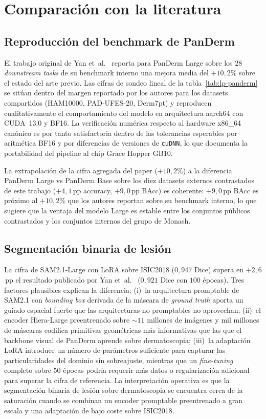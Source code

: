 \section{Comparación con la literatura}
\label{sec:lit}

\subsection{Reproducción del benchmark de PanDerm}
\label{sec:lit-panderm}

El trabajo original de Yan et~al.~\cite{panderm2025} reporta para
PanDerm Large sobre los $28$ \emph{downstream tasks} de su
benchmark interno una mejora media del $+10{,}2\%$ sobre el
estado del arte previo. Las cifras de sondeo lineal de la
tabla~\ref{tab:lp-panderm} se sitúan dentro del margen reportado
por los autores para los datasets compartidos (HAM10000,
PAD-UFES-20, Derm7pt) y reproducen cualitativamente el
comportamiento del modelo en arquitectura aarch64 con CUDA~13.0 y
BF16. La verificación numérica respecto al hardware x86\_64
canónico es por tanto satisfactoria dentro de las tolerancias
esperables por aritmética BF16 y por diferencias de versiones de
\texttt{cuDNN}, lo que documenta la portabilidad del pipeline al
chip Grace Hopper GB10.

La extrapolación de la cifra agregada del paper ($+10{,}2\%$)
a la diferencia PanDerm Large vs PanDerm Base sobre los diez
datasets externos contrastados de este trabajo
($+4{,}1$\,pp accuracy, $+9{,}0$\,pp BAcc) es coherente:
$+9{,}0$\,pp BAcc es próximo al $+10{,}2\%$ que los autores
reportan sobre su benchmark interno, lo que sugiere que la ventaja
del modelo Large es estable entre los conjuntos públicos
contrastados y los conjuntos internos del grupo de Monash.

\subsection{Segmentación binaria de lesión}
\label{sec:lit-seg}

La cifra de SAM2.1-Large con LoRA sobre ISIC2018 ($0{,}947$ Dice)
supera en $+2{,}6$\,pp el resultado publicado por
Yan et~al.~\cite{panderm2025} ($0{,}921$ Dice con $100$ épocas).
Tres factores plausibles explican la diferencia: (i)~la
arquitectura promptable de SAM2.1 con \emph{bounding box} derivada
de la máscara de \emph{ground truth} aporta un guiado espacial
fuerte que las arquitecturas no promptables no aprovechan;
(ii)~el encoder Hiera-Large preentrenado sobre $\sim 11$
millones de imágenes y mil millones de máscaras codifica
primitivas geométricas más informativas que las que el backbone
visual de PanDerm aprende sobre dermatoscopia; (iii)~la adaptación
LoRA introduce un número de parámetros suficiente para capturar las
particularidades del dominio sin sobreajuste, mientras que un
\emph{fine-tuning} completo sobre $50$ épocas podría requerir
más datos o regularización adicional para superar la cifra de
referencia. La interpretación operativa es que la segmentación
binaria de lesión sobre dermatoscopia se encuentra cerca de la
saturación cuando se combinan un encoder promptable preentrenado a
gran escala y una adaptación de bajo coste sobre ISIC2018.

